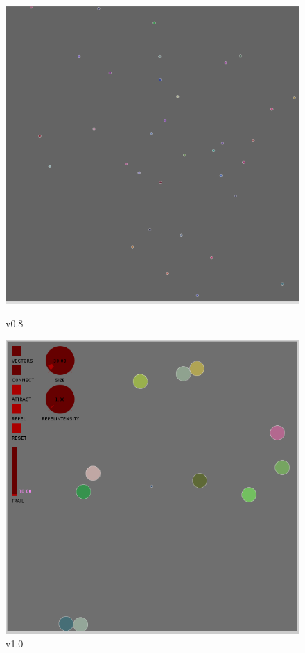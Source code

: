 \documentclass[12pt]{article}
\begin{document}
\begin{figure}[H]
  \centering
  \begin{minipage}{.5\textwidth}
    \centering
    \includegraphics[scale=0.35]{experiment}
    \caption{v0.8}
  \end{minipage}%
  \begin{minipage}{.5\textwidth}
    \centering
    \includegraphics[scale=0.35]{thirdver}
    \caption{v1.0}
    \end{minipage}%
\end{figure}
\end{document}
